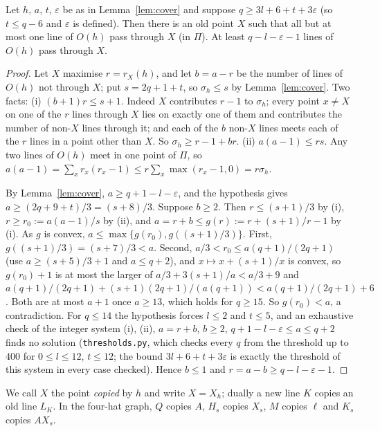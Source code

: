 \begin{lemma}\label{lem:copy}
Let $h$, $a$, $t$, $\varepsilon$ be as in Lemma~\ref{lem:cover} and suppose $q \ge 3l + 6 + t + 3\varepsilon$ (so $t \le q-6$ and
$\varepsilon$ is defined). Then there is an
old point $X$ such that all but at most one line of $O(h)$ pass through $X$ (in $\Pi$). At least $q-l-\varepsilon-1$ lines of
$O(h)$ pass through $X$.
\end{lemma}
\begin{proof}
Let $X$ maximise $r = r_X(h)$, and let $b = a - r$ be the number of lines of $O(h)$ not through $X$; put $s = 2q+1+t$,
so $\sigma_h \le s$ by Lemma~\ref{lem:cover}. Two facts:
(i) $(b+1)r \le s+1$. Indeed $X$ contributes $r-1$ to $\sigma_h$; every point $x \ne X$ on one of the $r$ lines through $X$
lies on exactly one of them and contributes the number of non-$X$ lines through it; and each of the $b$ non-$X$
lines meets each of the $r$ lines in a point other than $X$. So $\sigma_h \ge r - 1 + br$.
(ii) $a(a-1) \le rs$. Any two lines of $O(h)$ meet in one point of $\Pi$, so
$a(a-1) = \sum_x r_x(r_x-1) \le r\sum_x \max(r_x-1,0) = r\sigma_h$.

By Lemma~\ref{lem:cover}, $a \ge q+1-l-\varepsilon$, and the hypothesis gives $a \ge (2q+9+t)/3 = (s+8)/3$. Suppose $b \ge 2$.
Then $r \le (s+1)/3$ by (i), $r \ge r_0 := a(a-1)/s$ by (ii), and $a = r + b \le g(r) := r + (s+1)/r - 1$ by (i).
As $g$ is convex, $a \le \max\{g(r_0), g((s+1)/3)\}$. First, $g((s+1)/3) = (s+7)/3 < a$. Second, $a/3 < r_0 \le a(q+1)/(2q+1)$
(use $a \ge (s+5)/3 + 1$ and $a \le q+2$), and $x \mapsto x + (s+1)/x$ is convex, so $g(r_0) + 1$ is at most the larger of
$a/3 + 3(s+1)/a < a/3 + 9$ and $a(q+1)/(2q+1) + (s+1)(2q+1)/(a(q+1)) < a(q+1)/(2q+1) + 6$. Both are at most $a+1$ once
$a \ge 13$, which holds for $q \ge 15$. So $g(r_0) < a$, a contradiction. For $q \le 14$ the hypothesis forces $l \le 2$ and
$t \le 5$, and an exhaustive check of the integer system (i), (ii), $a = r + b$, $b \ge 2$, $q+1-l-\varepsilon \le a \le q+2$ finds no
solution (\texttt{thresholds.py}, which checks every $q$ from the threshold up to $400$ for $0 \le l \le 12$, $t \le 12$; the
bound $3l+6+t+3\varepsilon$ is exactly the threshold of this system in every case checked). Hence $b \le 1$ and $r = a - b \ge q - l - \varepsilon - 1$.
\end{proof}

We call $X$ the point \emph{copied} by $h$ and write $X = X_h$; dually a new line $K$ copies an old line $L_K$.
In the four-hat graph, $Q$ copies $A$, $H_s$ copies $X_s$, $M$ copies $\ell$ and $K_s$ copies $AX_s$.

